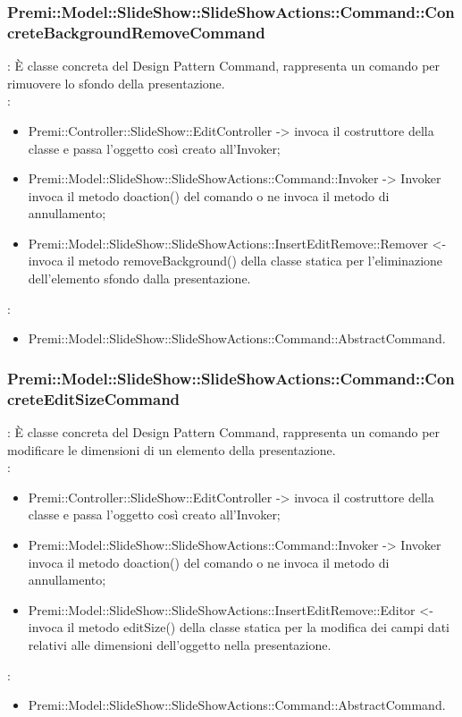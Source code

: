 {                    \subsubsection{Premi::Model::SlideShow::SlideShowActions::Command::ConcreteBackgroundRemoveCommand}{
				\textbf{\tipo}: È classe concreta del Design Pattern Command, rappresenta un comando per rimuovere lo sfondo della presentazione.\\	
				\textbf{\relaz}: 
				\begin{itemize}
					\item Premi::Controller::SlideShow::EditController -> invoca il costruttore della classe e passa l’oggetto così creato all’Invoker;
					\item Premi::Model::SlideShow::SlideShowActions::Command::Invoker -> Invoker invoca il metodo doaction() del comando o ne invoca il metodo di annullamento;
                    \item Premi::Model::SlideShow::SlideShowActions::InsertEditRemove::Remover <- invoca il metodo removeBackground() della classe statica per l’eliminazione dell'elemento sfondo dalla presentazione.
				\end{itemize}	
                \textbf{\base}: 
                    \begin{itemize}
                    \item Premi::Model::SlideShow::SlideShowActions::Command::AbstractCommand.
                    \end{itemize}
                    }
                        \subsubsection{Premi::Model::SlideShow::SlideShowActions::Command::ConcreteEditSizeCommand}{
				\textbf{\tipo}: È classe concreta del Design Pattern Command, rappresenta un comando per modificare le dimensioni di un elemento della presentazione.\\	
				\textbf{\relaz}: 
				\begin{itemize}
					\item Premi::Controller::SlideShow::EditController -> invoca il costruttore della classe e passa l’oggetto così creato all’Invoker;
					\item Premi::Model::SlideShow::SlideShowActions::Command::Invoker -> Invoker invoca il metodo doaction() del comando o ne invoca il metodo di annullamento;
                    \item Premi::Model::SlideShow::SlideShowActions::InsertEditRemove::Editor <- invoca il metodo editSize() della classe statica per la modifica dei campi dati relativi alle dimensioni dell'oggetto nella presentazione.
				\end{itemize}	
                \textbf{\base}: 
                    \begin{itemize}
                    \item Premi::Model::SlideShow::SlideShowActions::Command::AbstractCommand.
                    \end{itemize}
                    }
}
